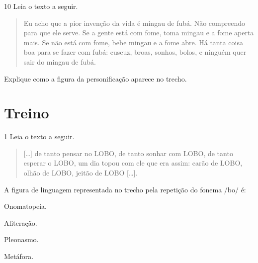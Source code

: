\num{10} Leia o texto a seguir.

\begin{quote}
Eu acho que a pior invenção da vida é mingau de fubá. Não compreendo
para que ele serve. Se a gente está com fome, toma mingau e a fome
aperta mais. Se não está com fome, bebe mingau e a fome abre. Há tanta
coisa boa para se fazer com fubá: cuscuz, broas, sonhos, bolos, e
ninguém quer sair do mingau de fubá.

\end{quote}

\noindent Explique como a figura da personificação aparece no trecho.


\section*{Treino}

\num{1} Leia o texto a seguir.

\begin{quote}
{[}\ldots{]} de tanto pensar no LOBO, de tanto sonhar com LOBO, de tanto
esperar o LOBO, um dia topou com ele que era assim: carão de LOBO, olhão
de LOBO, jeitão de LOBO {[}\ldots{]}.

\end{quote}


A figura de linguagem representada no trecho pela repetição do fonema
/bo/ é:

\begin{escolha}
\item Onomatopeia.
\item Aliteração.
\item Pleonasmo.
\item Metáfora.
\end{escolha}


